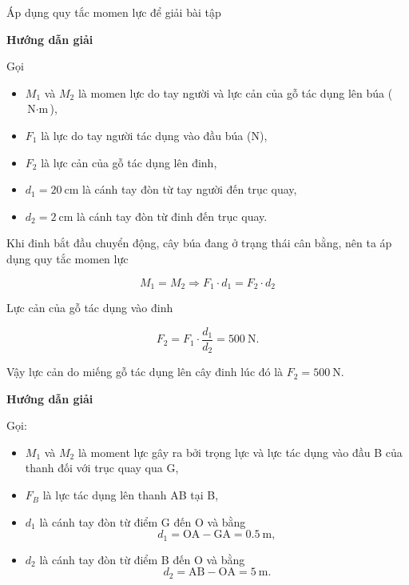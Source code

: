 \begin{dang}{Áp dụng quy tắc momen lực để giải bài tập}
	{	\begin{center}
			\textbf{Hướng dẫn giải}
		\end{center}
		
		Gọi 
		\begin{itemize}
			\item $M_1$ và $M_2$ là momen lực do tay người và lực cản của gỗ tác dụng lên búa ($\si{\newton\cdot\meter}$),
			\item $F_1$ là lực do tay người tác dụng vào đầu búa ($\si{\newton}$),
			\item $F_2$ là lực cản của gỗ tác dụng lên đinh, 
			\item  $d_1=\SI{20}{\centi\meter}$ là cánh tay đòn từ tay người đến trục quay, 
			\item  $d_2=\SI{2}{\centi\meter}$ là cánh tay đòn từ đinh đến trục quay. 
		\end{itemize}
		
		Khi đinh bắt đầu chuyển động, cây búa đang ở trạng thái cân bằng, nên ta áp dụng quy tắc momen lực
		
		$$M_1=M_2 \Rightarrow F_1\cdot d_1 = F_2\cdot d_2$$
		
		Lực cản của gỗ tác dụng vào đinh 
		
		$$F_2=F_1\cdot \dfrac{d_1}{d_2}=\SI{500}{\newton}.$$
		
		Vậy lực cản do miếng gỗ tác dụng lên cây đinh lúc đó là $F_2=\SI{500}{\newton}$.
	}
	{	\begin{center}
			\textbf{Hướng dẫn giải}
		\end{center}
		
		Gọi: 
		\begin{itemize}
			\item $M_1$ và $M_2$ là moment lực gây ra bởi trọng lực và lực tác dụng vào đầu B của thanh đối với trục quay qua G,
			\item $F_B$ là lực tác dụng lên thanh AB tại B, 
			\item  $d_1$ là cánh tay đòn từ điểm G đến O và bằng
			\begin{equation*}
				d_1 = \text{OA} - \text{GA} =\SI{0,5}{\meter},
			\end{equation*} 
			\item  $d_2$ là cánh tay đòn từ điểm B đến O và bằng
			\begin{equation*}
				d_2 = \text{AB} - \text{OA} =\SI{5}{\meter}. 
			\end{equation*} 
		\end{itemize}
		
}
\end{dang}
